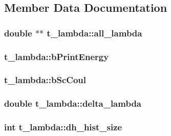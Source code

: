 \subsection{\-Member \-Data \-Documentation}
\hypertarget{structt__lambda_af6705991007f6e466f9b4c3c66a15cfe}{
\subsubsection[{all\-\_\-lambda}]{\setlength{\rightskip}{0pt plus 5cm}double $\ast$$\ast$ {\bf t\-\_\-lambda\-::all\-\_\-lambda}}}\label{structt__lambda_af6705991007f6e466f9b4c3c66a15cfe}
\hypertarget{structt__lambda_adb04c4ebb1ab165f2ad655905dc8e527}{
\subsubsection[{b\-Print\-Energy}]{ {\bf t\-\_\-lambda\-::b\-Print\-Energy}}}\label{structt__lambda_adb04c4ebb1ab165f2ad655905dc8e527}
\hypertarget{structt__lambda_aa7bd22f7a028a8d4598b591753451651}{
\subsubsection[{b\-Sc\-Coul}]{ {\bf t\-\_\-lambda\-::b\-Sc\-Coul}}}\label{structt__lambda_aa7bd22f7a028a8d4598b591753451651}
\hypertarget{structt__lambda_a6cce734f772f684883b7c510bd8b9d9e}{
\subsubsection[{delta\-\_\-lambda}]{\setlength{\rightskip}{0pt plus 5cm}double {\bf t\-\_\-lambda\-::delta\-\_\-lambda}}}\label{structt__lambda_a6cce734f772f684883b7c510bd8b9d9e}
\hypertarget{structt__lambda_acdbcd453fdb7af3fa9af6850f9254a1b}{
\subsubsection[{dh\-\_\-hist\-\_\-size}]{\setlength{\rightskip}{0pt plus 5cm}int {\bf t\-\_\-lambda\-::dh\-\_\-hist\-\_\-size}}}\label{structt__lambda_acdbcd453fdb7af3fa9af6850f9254a1b}
